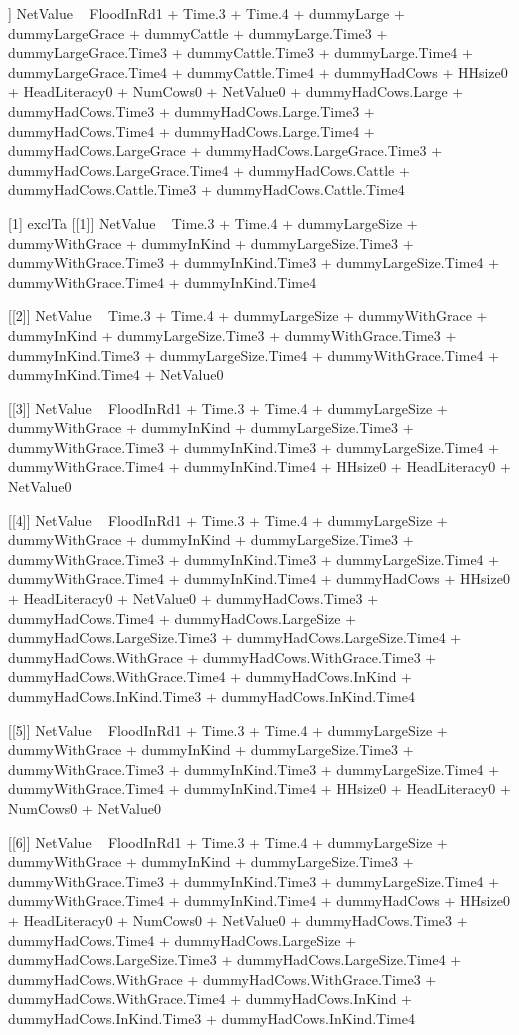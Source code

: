 \begin{Schunk}
\begin{Soutput}
[[6]]
NetValue ~ FloodInRd1 + Time.3 + Time.4 + dummyLarge + dummyLargeGrace + 
    dummyCattle + dummyLarge.Time3 + dummyLargeGrace.Time3 + 
    dummyCattle.Time3 + dummyLarge.Time4 + dummyLargeGrace.Time4 + 
    dummyCattle.Time4 + dummyHadCows + HHsize0 + HeadLiteracy0 + 
    NumCows0 + NetValue0 + dummyHadCows.Large + dummyHadCows.Time3 + 
    dummyHadCows.Large.Time3 + dummyHadCows.Time4 + dummyHadCows.Large.Time4 + 
    dummyHadCows.LargeGrace + dummyHadCows.LargeGrace.Time3 + 
    dummyHadCows.LargeGrace.Time4 + dummyHadCows.Cattle + dummyHadCows.Cattle.Time3 + 
    dummyHadCows.Cattle.Time4

[1] exclTa
[[1]]
NetValue ~ Time.3 + Time.4 + dummyLargeSize + dummyWithGrace + 
    dummyInKind + dummyLargeSize.Time3 + dummyWithGrace.Time3 + 
    dummyInKind.Time3 + dummyLargeSize.Time4 + dummyWithGrace.Time4 + 
    dummyInKind.Time4

[[2]]
NetValue ~ Time.3 + Time.4 + dummyLargeSize + dummyWithGrace + 
    dummyInKind + dummyLargeSize.Time3 + dummyWithGrace.Time3 + 
    dummyInKind.Time3 + dummyLargeSize.Time4 + dummyWithGrace.Time4 + 
    dummyInKind.Time4 + NetValue0

[[3]]
NetValue ~ FloodInRd1 + Time.3 + Time.4 + dummyLargeSize + dummyWithGrace + 
    dummyInKind + dummyLargeSize.Time3 + dummyWithGrace.Time3 + 
    dummyInKind.Time3 + dummyLargeSize.Time4 + dummyWithGrace.Time4 + 
    dummyInKind.Time4 + HHsize0 + HeadLiteracy0 + NetValue0

[[4]]
NetValue ~ FloodInRd1 + Time.3 + Time.4 + dummyLargeSize + dummyWithGrace + 
    dummyInKind + dummyLargeSize.Time3 + dummyWithGrace.Time3 + 
    dummyInKind.Time3 + dummyLargeSize.Time4 + dummyWithGrace.Time4 + 
    dummyInKind.Time4 + dummyHadCows + HHsize0 + HeadLiteracy0 + 
    NetValue0 + dummyHadCows.Time3 + dummyHadCows.Time4 + dummyHadCows.LargeSize + 
    dummyHadCows.LargeSize.Time3 + dummyHadCows.LargeSize.Time4 + 
    dummyHadCows.WithGrace + dummyHadCows.WithGrace.Time3 + dummyHadCows.WithGrace.Time4 + 
    dummyHadCows.InKind + dummyHadCows.InKind.Time3 + dummyHadCows.InKind.Time4

[[5]]
NetValue ~ FloodInRd1 + Time.3 + Time.4 + dummyLargeSize + dummyWithGrace + 
    dummyInKind + dummyLargeSize.Time3 + dummyWithGrace.Time3 + 
    dummyInKind.Time3 + dummyLargeSize.Time4 + dummyWithGrace.Time4 + 
    dummyInKind.Time4 + HHsize0 + HeadLiteracy0 + NumCows0 + 
    NetValue0

[[6]]
NetValue ~ FloodInRd1 + Time.3 + Time.4 + dummyLargeSize + dummyWithGrace + 
    dummyInKind + dummyLargeSize.Time3 + dummyWithGrace.Time3 + 
    dummyInKind.Time3 + dummyLargeSize.Time4 + dummyWithGrace.Time4 + 
    dummyInKind.Time4 + dummyHadCows + HHsize0 + HeadLiteracy0 + 
    NumCows0 + NetValue0 + dummyHadCows.Time3 + dummyHadCows.Time4 + 
    dummyHadCows.LargeSize + dummyHadCows.LargeSize.Time3 + dummyHadCows.LargeSize.Time4 + 
    dummyHadCows.WithGrace + dummyHadCows.WithGrace.Time3 + dummyHadCows.WithGrace.Time4 + 
    dummyHadCows.InKind + dummyHadCows.InKind.Time3 + dummyHadCows.InKind.Time4


\end{Soutput}
\end{Schunk}
